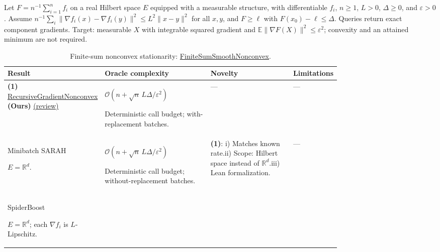 \begin{table}[tp]
\centering
\caption{Finite-sum nonconvex stationarity: \href{https://github.com/k3nfalt/longtails/blob/main/LongTails/Setups/FiniteSumSmoothNonconvex.lean}{Finite\allowbreak{}Sum\allowbreak{}Smooth\allowbreak{}Nonconvex}.}\label{tab:FiniteSumSmoothNonconvex}
\parbox{\linewidth}{\footnotesize Let $F=n^{-1}\sum_{i=1}^n f_i$ on a real Hilbert space $E$ equipped with a measurable structure, with differentiable $f_i$, $n\ge1$, $L>0$, $\Delta\ge0$, and $\varepsilon>0$. Assume $n^{-1}\sum_i\|\nabla f_i(x)-\nabla f_i(y)\|^2\le L^2\|x-y\|^2$ for all $x,y$, and $F\ge\ell$ with $F(x_0)-\ell\le\Delta$. Queries return exact component gradients. Target: measurable $X$ with integrable squared gradient and $\mathbb{E}\|\nabla F(X)\|^2\le\varepsilon^2$; convexity and an attained minimum are not required.}\par\smallskip
\begin{threeparttable}
\footnotesize
\setlength{\tabcolsep}{4pt}\renewcommand{\arraystretch}{1.25}
\begin{tabularx}{\linewidth}{@{}>{\raggedright\arraybackslash}p{0.20\linewidth}>{\raggedright\arraybackslash}p{0.32\linewidth}>{\raggedright\arraybackslash}p{0.25\linewidth}>{\raggedright\arraybackslash}X@{}}
\toprule
\textbf{Result} & \textbf{Oracle complexity} & \textbf{Novelty} & \textbf{Limitations} \\
\midrule
\textbf{(1)} \href{https://github.com/k3nfalt/longtails/blob/main/LongTails/Theorems/RecursiveGradientNonconvex.lean}{Recursive\allowbreak{}Gradient\allowbreak{}Nonconvex} \textbf{(Ours)} \href{https://github.com/k3nfalt/longtails/blob/main/scripts/reviews/RecursiveGradientNonconvex.md}{(review)}
& $\mathcal{O}\!(n+\sqrt n\,L\Delta/\varepsilon^2)$\par Deterministic call budget; with-replacement batches.
& ---
& --- \\
\midrule[1.2pt]
Minibatch SARAH \citep[Thm.~2, Cor.~3]{nguyen2019sarahv2fsnc}\par $E=\mathbb{R}^d$.
& $\mathcal{O}\!(n+\sqrt n\,L\Delta/\varepsilon^2)$\par Deterministic call budget; without-replacement batches.
& \textbf{(1)}: i) Matches known rate.\newline ii) Scope: Hilbert space instead of $\mathbb{R}^d$.\newline iii) Lean formalization.
& --- \\
\midrule
SpiderBoost \citep[Thms.~1, 9]{wang2020spiderboostv3fsnc}\par $E=\mathbb{R}^d$; each $\nabla f_i$ is $L$-Lipschitz.

\end{tabularx}
\end{threeparttable}
\end{table}
